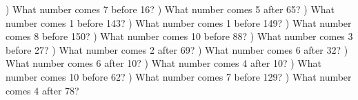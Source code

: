 \documentclass{article}%
\begin{document}
\newline%
) What number comes 7 before 16?%
\newline%
\newline%
) What number comes 5 after 65?%
\newline%
\newline%
) What number comes 1 before 143?%
\newline%
\newline%
) What number comes 1 before 149?%
\newline%
\newline%
) What number comes 8 before 150?%
\newline%
\newline%
) What number comes 10 before 88?%
\newline%
\newline%
) What number comes 3 before 27?%
\newline%
\newline%
) What number comes 2 after 69?%
\newline%
\newline%
) What number comes 6 after 32?%
\newline%
\newline%
) What number comes 6 after 10?%
\newline%
\newline%
) What number comes 4 after 10?%
\newline%
\newline%
) What number comes 10 before 62?%
\newline%
\newline%
) What number comes 7 before 129?%
\newline%
\newline%
) What number comes 4 after 78?%
\newline%
\end{document}
